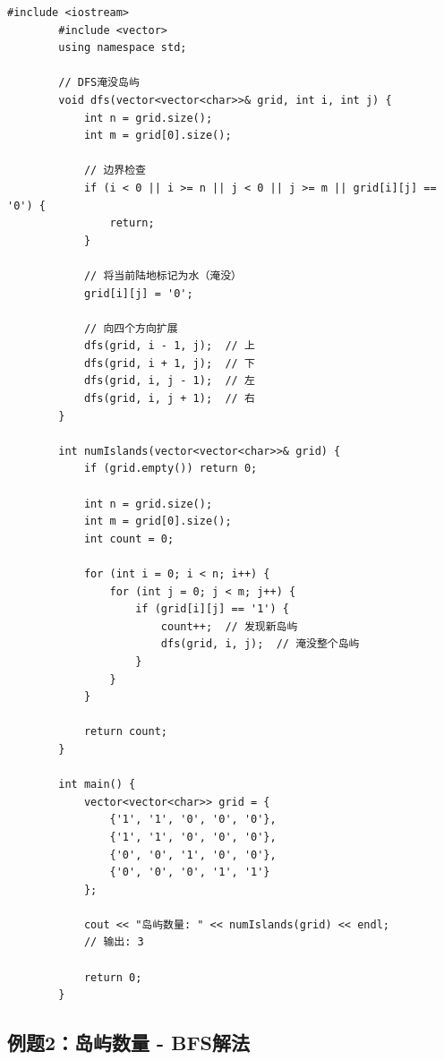 \documentclass[12pt,a4paper]{article}
\begin{document}
	\begin{lstlisting}[caption={例题1：岛屿数量 - DFS解法}]
		#include <iostream>
		#include <vector>
		using namespace std;
		
		// DFS淹没岛屿
		void dfs(vector<vector<char>>& grid, int i, int j) {
			int n = grid.size();
			int m = grid[0].size();
			
			// 边界检查
			if (i < 0 || i >= n || j < 0 || j >= m || grid[i][j] == '0') {
				return;
			}
			
			// 将当前陆地标记为水（淹没）
			grid[i][j] = '0';
			
			// 向四个方向扩展
			dfs(grid, i - 1, j);  // 上
			dfs(grid, i + 1, j);  // 下
			dfs(grid, i, j - 1);  // 左
			dfs(grid, i, j + 1);  // 右
		}
		
		int numIslands(vector<vector<char>>& grid) {
			if (grid.empty()) return 0;
			
			int n = grid.size();
			int m = grid[0].size();
			int count = 0;
			
			for (int i = 0; i < n; i++) {
				for (int j = 0; j < m; j++) {
					if (grid[i][j] == '1') {
						count++;  // 发现新岛屿
						dfs(grid, i, j);  // 淹没整个岛屿
					}
				}
			}
			
			return count;
		}
		
		int main() {
			vector<vector<char>> grid = {
				{'1', '1', '0', '0', '0'},
				{'1', '1', '0', '0', '0'},
				{'0', '0', '1', '0', '0'},
				{'0', '0', '0', '1', '1'}
			};
			
			cout << "岛屿数量: " << numIslands(grid) << endl;
			// 输出: 3
			
			return 0;
		}
	\end{lstlisting}
	
	\subsection{例题2：岛屿数量 - BFS解法}
	
\end{document}
